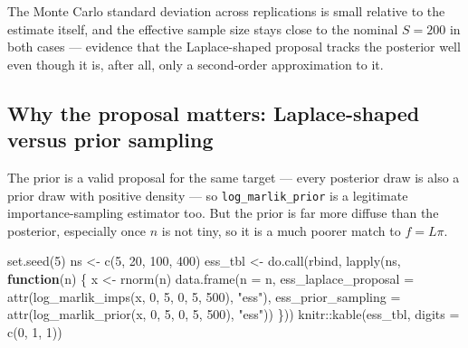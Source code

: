\documentclass[
  letterpaper,
  DIV=11,
  numbers=noendperiod]{scrreprt}
\newenvironment{Shaded}{\begin{snugshade}}{\end{snugshade}}
\newcommand{\AttributeTok}[1]{\textcolor[rgb]{0.40,0.45,0.13}{#1}}
\newcommand{\ControlFlowTok}[1]{\textcolor[rgb]{0.00,0.23,0.31}{\textbf{#1}}}
\newcommand{\DecValTok}[1]{\textcolor[rgb]{0.68,0.00,0.00}{#1}}
\newcommand{\FunctionTok}[1]{\textcolor[rgb]{0.28,0.35,0.67}{#1}}
\newcommand{\NormalTok}[1]{\textcolor[rgb]{0.00,0.23,0.31}{#1}}
\newcommand{\OtherTok}[1]{\textcolor[rgb]{0.00,0.23,0.31}{#1}}
\newcommand{\SpecialCharTok}[1]{\textcolor[rgb]{0.37,0.37,0.37}{#1}}
\newcommand{\StringTok}[1]{\textcolor[rgb]{0.13,0.47,0.30}{#1}}
\begin{document}
The Monte Carlo standard deviation across replications is small relative
to the estimate itself, and the effective sample size stays close to the
nominal \(S=200\) in both cases --- evidence that the Laplace-shaped
proposal tracks the posterior well even though it is, after all, only a
second-order approximation to it.

\subsection{Why the proposal matters: Laplace-shaped versus prior
sampling}\label{why-the-proposal-matters-laplace-shaped-versus-prior-sampling}

The prior is a valid proposal for the same target --- every posterior
draw is also a prior draw with positive density --- so
\texttt{log\_marlik\_prior} is a legitimate importance-sampling
estimator too. But the prior is far more diffuse than the posterior,
especially once \(n\) is not tiny, so it is a much poorer match to
\(f = L\pi\).

\begin{Shaded}
\begin{Highlighting}[]
\FunctionTok{set.seed}\NormalTok{(}\DecValTok{5}\NormalTok{)}
\NormalTok{ns }\OtherTok{\textless{}{-}} \FunctionTok{c}\NormalTok{(}\DecValTok{5}\NormalTok{, }\DecValTok{20}\NormalTok{, }\DecValTok{100}\NormalTok{, }\DecValTok{400}\NormalTok{)}
\NormalTok{ess\_tbl }\OtherTok{\textless{}{-}} \FunctionTok{do.call}\NormalTok{(rbind, }\FunctionTok{lapply}\NormalTok{(ns, }\ControlFlowTok{function}\NormalTok{(n) \{}
\NormalTok{    x }\OtherTok{\textless{}{-}} \FunctionTok{rnorm}\NormalTok{(n)}
    \FunctionTok{data.frame}\NormalTok{(}\AttributeTok{n =}\NormalTok{ n,}
               \AttributeTok{ess\_laplace\_proposal =} \FunctionTok{attr}\NormalTok{(}\FunctionTok{log\_marlik\_imps}\NormalTok{(x, }\DecValTok{0}\NormalTok{, }\DecValTok{5}\NormalTok{, }\DecValTok{0}\NormalTok{, }\DecValTok{5}\NormalTok{, }\DecValTok{500}\NormalTok{), }\StringTok{"ess"}\NormalTok{),}
               \AttributeTok{ess\_prior\_sampling   =} \FunctionTok{attr}\NormalTok{(}\FunctionTok{log\_marlik\_prior}\NormalTok{(x, }\DecValTok{0}\NormalTok{, }\DecValTok{5}\NormalTok{, }\DecValTok{0}\NormalTok{, }\DecValTok{5}\NormalTok{, }\DecValTok{500}\NormalTok{), }\StringTok{"ess"}\NormalTok{))}
\NormalTok{\}))}
\NormalTok{knitr}\SpecialCharTok{::}\FunctionTok{kable}\NormalTok{(ess\_tbl, }\AttributeTok{digits =} \FunctionTok{c}\NormalTok{(}\DecValTok{0}\NormalTok{, }\DecValTok{1}\NormalTok{, }\DecValTok{1}\NormalTok{))}
\end{Highlighting}
\end{Shaded}
\end{document}
